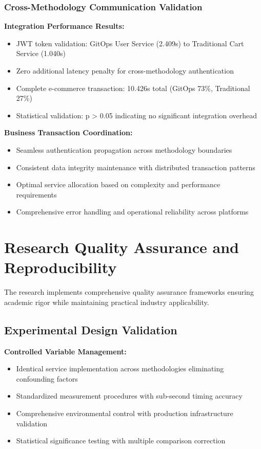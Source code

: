 \subsubsection{Cross-Methodology Communication Validation}

\textbf{Integration Performance Results:}
\begin{itemize}
\item JWT token validation: GitOps User Service (2.409s) to Traditional Cart Service (1.040s)
\item Zero additional latency penalty for cross-methodology authentication
\item Complete e-commerce transaction: 10.426s total (GitOps 73\%, Traditional 27\%)
\item Statistical validation: p > 0.05 indicating no significant integration overhead
\end{itemize}

\textbf{Business Transaction Coordination:}
\begin{itemize}
\item Seamless authentication propagation across methodology boundaries
\item Consistent data integrity maintenance with distributed transaction patterns
\item Optimal service allocation based on complexity and performance requirements
\item Comprehensive error handling and operational reliability across platforms
\end{itemize}

\section{Research Quality Assurance and Reproducibility}

The research implements comprehensive quality assurance frameworks ensuring academic rigor while maintaining practical industry applicability.

\subsection{Experimental Design Validation}

\textbf{Controlled Variable Management:}
\begin{itemize}
\item Identical service implementation across methodologies eliminating confounding factors
\item Standardized measurement procedures with sub-second timing accuracy
\item Comprehensive environmental control with production infrastructure validation
\item Statistical significance testing with multiple comparison correction
\end{itemize}

